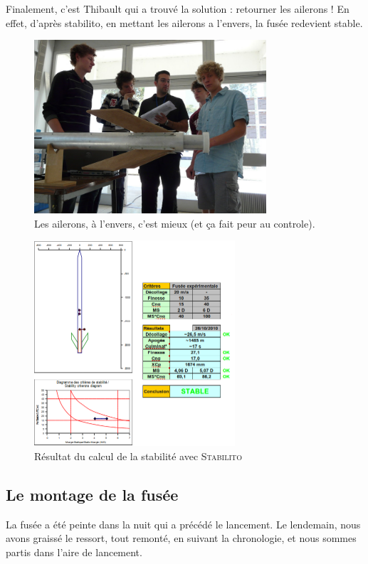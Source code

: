 \documentclass[a4paper,12pt]{scrartcl}
\begin{document}
	    Finalement, c'est Thibault qui a trouvé la solution : retourner les ailerons ! En effet, d'après stabilito, en mettant les ailerons a l'envers, la fusée redevient stable.
	      \begin{figure}[H]
		    \begin{center}
		      \caption{Les ailerons, à l'envers, c'est mieux (et ça fait peur au controle).}
		      \includegraphics[height=244px, width=326px]{Photos_Mercury/ailerons-controles.jpg}
		    \end{center}
	      \end{figure}
	      
	     \begin{figure}[H]
		    \begin{center}
		      \caption{Résultat du calcul de la stabilité avec \textsc{Stabilito}}
		      \includegraphics[height=289px, width=282px]{Photos_Mercury/stabilite.png}
		    \end{center}
	      \end{figure}

	  \subsection{Le montage de la fusée}
	   La fusée a été peinte dans la nuit qui a précédé le lancement.
	   Le lendemain, nous avons graissé le ressort, tout remonté, en suivant la chronologie, et nous sommes partis dans l'aire de lancement.
\end{document}
